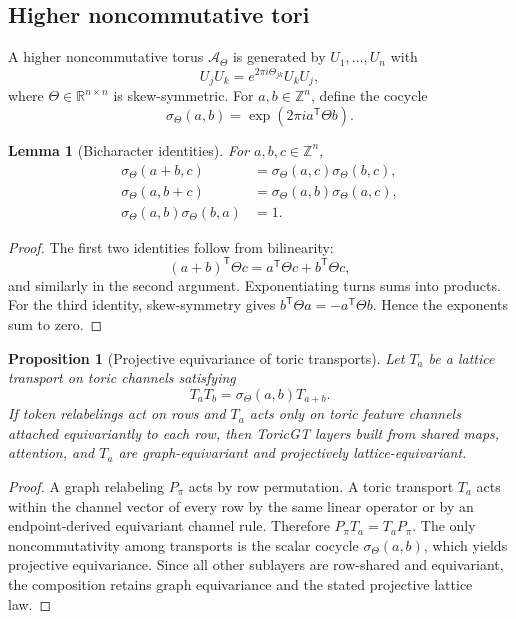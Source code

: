 \documentclass[11pt]{article}
\theoremstyle{definition}
\theoremstyle{plain}
\newtheorem{lemma}[definition]{Lemma}
\newtheorem{proposition}[definition]{Proposition}
\theoremstyle{remark}
\numberwithin{equation}{section}
\newcommand{\R}{\mathbb{R}}
\newcommand{\Z}{\mathbb{Z}}
\newcommand{\A}{\mathcal{A}}
\newcommand{\transpose}{^{\mathsf T}}
\begin{document}
\subsection{Higher noncommutative tori}

A higher noncommutative torus $\A_\Theta$ is generated by $U_1,\ldots,U_n$ with
\begin{equation}
  U_jU_k=e^{2\pi i\Theta_{jk}}U_kU_j,
\end{equation}
where $\Theta\in\R^{n\times n}$ is skew-symmetric.  For $a,b\in\Z^n$, define the cocycle
\begin{equation}
  \sigma_\Theta(a,b)=\exp(2\pi i a\transpose\Theta b).
\end{equation}

\begin{lemma}[Bicharacter identities]
For $a,b,c\in\Z^n$,
\begin{align}
  \sigma_\Theta(a+b,c)&=\sigma_\Theta(a,c)\sigma_\Theta(b,c),\\
  \sigma_\Theta(a,b+c)&=\sigma_\Theta(a,b)\sigma_\Theta(a,c),\\
  \sigma_\Theta(a,b)\sigma_\Theta(b,a)&=1.
\end{align}
\end{lemma}

\begin{proof}
The first two identities follow from bilinearity:
\begin{equation}
  (a+b)\transpose\Theta c=a\transpose\Theta c+b\transpose\Theta c,
\end{equation}
and similarly in the second argument.  Exponentiating turns sums into products.  For the third identity, skew-symmetry gives $b\transpose\Theta a=-a\transpose\Theta b$.  Hence the exponents sum to zero.
\end{proof}

\begin{proposition}[Projective equivariance of toric transports]
Let $T_a$ be a lattice transport on toric channels satisfying
\begin{equation}
  T_aT_b=\sigma_\Theta(a,b)T_{a+b}.
\end{equation}
If token relabelings act on rows and $T_a$ acts only on toric feature channels attached equivariantly to each row, then ToricGT layers built from shared maps, attention, and $T_a$ are graph-equivariant and projectively lattice-equivariant.
\end{proposition}

\begin{proof}
A graph relabeling $P_\pi$ acts by row permutation.  A toric transport $T_a$ acts within the channel vector of every row by the same linear operator or by an endpoint-derived equivariant channel rule.  Therefore $P_\pi T_a=T_aP_\pi$.  The only noncommutativity among transports is the scalar cocycle $\sigma_\Theta(a,b)$, which yields projective equivariance.  Since all other sublayers are row-shared and equivariant, the composition retains graph equivariance and the stated projective lattice law.
\end{proof}
\end{document}
